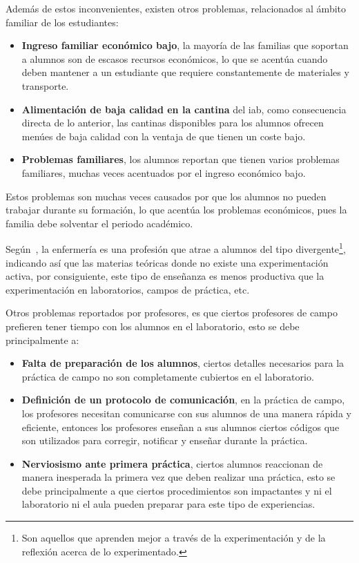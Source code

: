 Además de estos inconvenientes, existen otros problemas, relacionados al ámbito
familiar de los estudiantes\cite{iab:tesis_alumnos}:

\begin{itemize}
    \item \textbf{Ingreso familiar económico bajo}, la mayoría de las familias que
        soportan a alumnos son de escasos recursos económicos, lo que se acentúa
        cuando deben mantener a un estudiante que requiere constantemente de
        materiales y transporte.
    \item \textbf{Alimentación de baja calidad en la cantina} del \Gls{iab}, como
        consecuencia directa de lo anterior, las cantinas disponibles para los
        alumnos ofrecen menúes de baja calidad con la ventaja de que tienen un
        coste bajo.
    \item \textbf{Problemas familiares}, los alumnos reportan que tienen varios
        problemas familiares, muchas veces acentuados por el ingreso económico
        bajo.
\end{itemize}


Estos problemas son muchas veces causados por que los alumnos no pueden trabajar
durante su formación, lo que acentúa los problemas económicos, pues la familia
debe solventar el periodo académico.

Según~\cite{humphreys2013developing}, la enfermería es una profesión que atrae a
alumnos del tipo divergente\footnote{Son aquellos que aprenden mejor a través de
    la experimentación y de la reflexión acerca de lo experimentado.}, indicando
así que las materias teóricas donde no existe una experimentación activa, por
consiguiente, este tipo de enseñanza es menos productiva que la experimentación
en laboratorios, campos de práctica, etc.

Otros problemas reportados por profesores, es que ciertos profesores de campo
prefieren tener tiempo con los alumnos en el laboratorio, esto se debe
principalmente a:

\begin{itemize}
    \item \textbf{Falta de preparación de los alumnos}, ciertos detalles necesarios para
        la práctica de campo no son completamente cubiertos en el laboratorio.
    \item \textbf{Definición de un protocolo de comunicación}, en la práctica de campo,
        los profesores necesitan comunicarse con sus alumnos de una manera
        rápida y eficiente, entonces los profesores enseñan a sus alumnos
        ciertos códigos que son utilizados para corregir, notificar y enseñar
        durante la práctica.
    \item \textbf{Nerviosismo ante primera práctica}, ciertos alumnos reaccionan de
        manera inesperada la primera vez que deben realizar una práctica, esto
        se debe principalmente a que ciertos procedimientos son impactantes y
        ni el laboratorio ni el aula pueden preparar para este tipo de
        experiencias.
\end{itemize}

